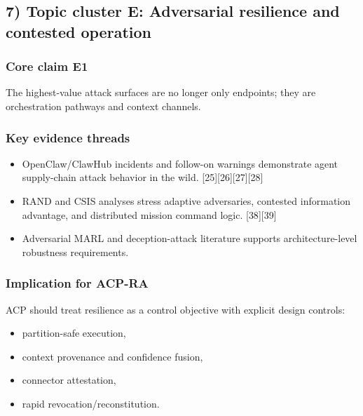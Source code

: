 \documentclass[
]{article}
\providecommand{\tightlist}{%
  \setlength{\itemsep}{0pt}\setlength{\parskip}{0pt}}
\begin{document}
\hypertarget{topic-cluster-e-adversarial-resilience-and-contested-operation}{%
\subsection{7) Topic cluster E: Adversarial resilience and contested
operation}\label{topic-cluster-e-adversarial-resilience-and-contested-operation}}

\hypertarget{core-claim-e1}{%
\subsubsection{Core claim E1}\label{core-claim-e1}}

The highest-value attack surfaces are no longer only endpoints; they are
orchestration pathways and context channels.

\hypertarget{key-evidence-threads-4}{%
\subsubsection{Key evidence threads}\label{key-evidence-threads-4}}

\begin{itemize}
\tightlist
\item
  OpenClaw/ClawHub incidents and follow-on warnings demonstrate agent
  supply-chain attack behavior in the wild.
  {[}25{]}{[}26{]}{[}27{]}{[}28{]}
\item
  RAND and CSIS analyses stress adaptive adversaries, contested
  information advantage, and distributed mission command logic.
  {[}38{]}{[}39{]}
\item
  Adversarial MARL and deception-attack literature supports
  architecture-level robustness requirements.
\end{itemize}

\hypertarget{implication-for-acp-ra-4}{%
\subsubsection{Implication for ACP-RA}\label{implication-for-acp-ra-4}}

ACP should treat resilience as a control objective with explicit design
controls:

\begin{itemize}
\tightlist
\item
  partition-safe execution,
\item
  context provenance and confidence fusion,
\item
  connector attestation,
\item
  rapid revocation/reconstitution.
\end{itemize}
\end{document}

